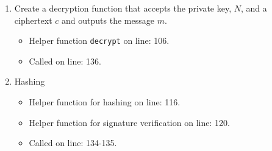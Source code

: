 \documentclass[a4paper]{article}
\begin{document}
\begin{enumerate}
    \item Create a decryption function that accepts the private key, $N$, and a ciphertext $c$ and outputs the message $m$. 
        \begin{itemize}
            \item Helper function \texttt{decrypt} on line: 106.
            \item Called on line: 136.
        \end{itemize}
    
    \item Hashing
        \begin{itemize}
            \item Helper function for hashing on line: 116.
            \item Helper function for signature verification on line: 120.
            \item Called on line: 134-135.
        \end{itemize}
\end{enumerate}

\end{document}
